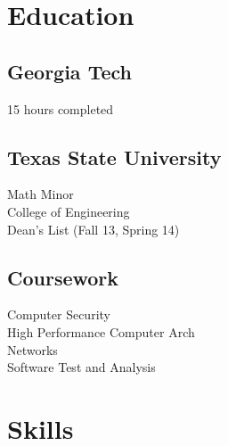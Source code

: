 \documentclass[letterpaper]{resume} %
\begin{document}
\begin{minipage}[t]{0.33\textwidth} %


\section{Education} 

\subsection{Georgia Tech}
15 hours completed\\ 

\sectionspace

\subsection{Texas State University}
Math Minor \\
College of Engineering \\
Dean's List (Fall 13, Spring 14) \\

\sectionspace %


\subsection{Coursework}

Computer Security \\
High Performance Computer Arch \\
Networks \\
Software Test and Analysis

\sectionspace %


\section{Skills}


\end{minipage}
\end{document}

